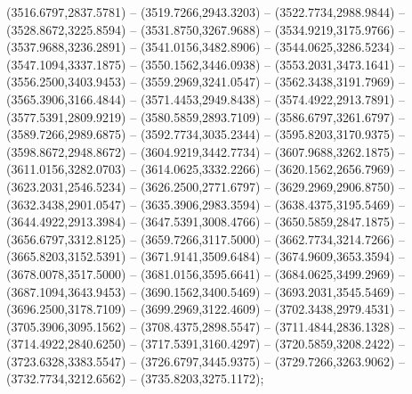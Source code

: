 \begin{scope}[y=0.80pt, x=0.80pt, yscale=-1.000000, xscale=1.000000, inner sep=0pt, outer sep=0pt]
    (3516.6797,2837.5781) -- (3519.7266,2943.3203) -- (3522.7734,2988.9844) --
    (3528.8672,3225.8594) -- (3531.8750,3267.9688) -- (3534.9219,3175.9766) --
    (3537.9688,3236.2891) -- (3541.0156,3482.8906) -- (3544.0625,3286.5234) --
    (3547.1094,3337.1875) -- (3550.1562,3446.0938) -- (3553.2031,3473.1641) --
    (3556.2500,3403.9453) -- (3559.2969,3241.0547) -- (3562.3438,3191.7969) --
    (3565.3906,3166.4844) -- (3571.4453,2949.8438) -- (3574.4922,2913.7891) --
    (3577.5391,2809.9219) -- (3580.5859,2893.7109) -- (3586.6797,3261.6797) --
    (3589.7266,2989.6875) -- (3592.7734,3035.2344) -- (3595.8203,3170.9375) --
    (3598.8672,2948.8672) -- (3604.9219,3442.7734) -- (3607.9688,3262.1875) --
    (3611.0156,3282.0703) -- (3614.0625,3332.2266) -- (3620.1562,2656.7969) --
    (3623.2031,2546.5234) -- (3626.2500,2771.6797) -- (3629.2969,2906.8750) --
    (3632.3438,2901.0547) -- (3635.3906,2983.3594) -- (3638.4375,3195.5469) --
    (3644.4922,2913.3984) -- (3647.5391,3008.4766) -- (3650.5859,2847.1875) --
    (3656.6797,3312.8125) -- (3659.7266,3117.5000) -- (3662.7734,3214.7266) --
    (3665.8203,3152.5391) -- (3671.9141,3509.6484) -- (3674.9609,3653.3594) --
    (3678.0078,3517.5000) -- (3681.0156,3595.6641) -- (3684.0625,3499.2969) --
    (3687.1094,3643.9453) -- (3690.1562,3400.5469) -- (3693.2031,3545.5469) --
    (3696.2500,3178.7109) -- (3699.2969,3122.4609) -- (3702.3438,2979.4531) --
    (3705.3906,3095.1562) -- (3708.4375,2898.5547) -- (3711.4844,2836.1328) --
    (3714.4922,2840.6250) -- (3717.5391,3160.4297) -- (3720.5859,3208.2422) --
    (3723.6328,3383.5547) -- (3726.6797,3445.9375) -- (3729.7266,3263.9062) --
    (3732.7734,3212.6562) -- (3735.8203,3275.1172);

\end{scope}
